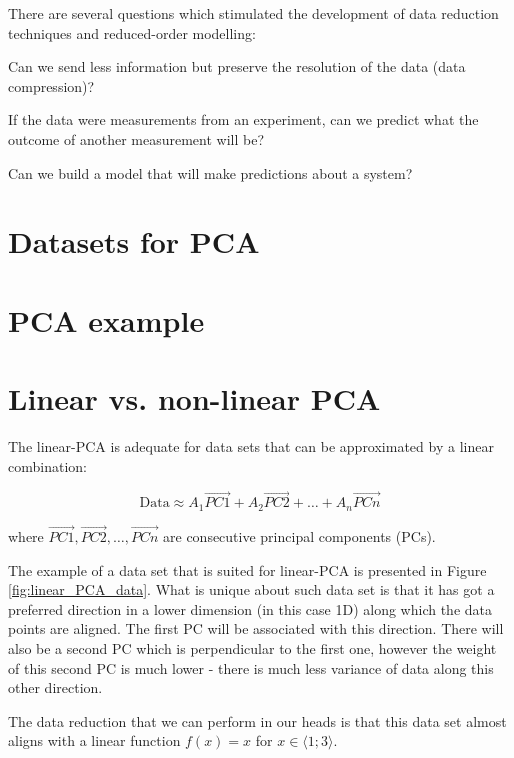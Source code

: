 \documentclass[20pt,twocolumn]{article}
\begin{document}
There are several questions which stimulated the development of data reduction techniques and reduced-order modelling:

Can we send less information but preserve the resolution of the data (data compression)?

If the data were measurements from an experiment, can we predict what the outcome of another measurement will be?

Can we build a model that will make predictions about a system?

\section{Datasets for PCA}



\section{PCA example}

\section{Linear vs. non-linear PCA}

The linear-PCA is adequate for data sets that can be approximated by a linear combination:

\begin{equation}
\text{Data} \approx A_1 \vec{PC1} + A_2 \vec{PC2} + \dots + A_n \vec{PCn}
\end{equation}

where $\vec{PC1}, \vec{PC2}, \dots, \vec{PCn}$ are consecutive principal components (PCs).

The example of a data set that is suited for linear-PCA is presented in Figure \ref{fig:linear_PCA_data}. What is unique about such data set is that it has got a preferred direction in a lower dimension (in this case 1D) along which the data points are aligned. The first PC will be associated with this direction. There will also be a second PC which is perpendicular to the first one, however the weight of this second PC is much lower - there is much less variance of data along this other direction.

The data reduction that we can perform in our heads is that this data set almost aligns with a linear function $f(x) = x$ for $x \in \langle 1; 3 \rangle$.
\end{document}
